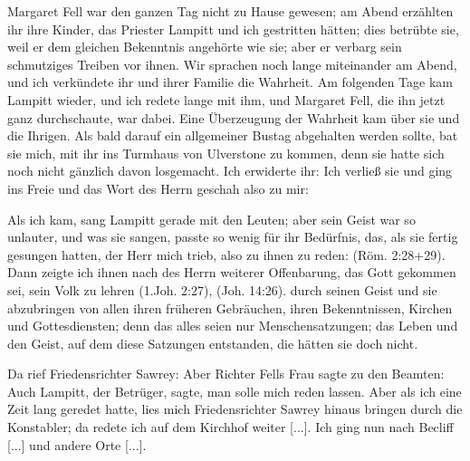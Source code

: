 Margaret 
Fell war den ganzen
Tag nicht zu Hause gewesen; am Abend erzählten ihr ihre Kinder,
das Priester Lampitt und ich gestritten hätten; dies betrübte sie,
weil er dem gleichen Bekenntnis angehörte wie sie; aber er
verbarg sein schmutziges Treiben vor ihnen.
Wir sprachen noch lange miteinander am Abend, und ich verkündete
ihr und ihrer Familie die Wahrheit. Am folgenden Tage
kam Lampitt wieder, und ich redete lange mit ihm, und Margaret
Fell, die ihn jetzt ganz durchschaute, war dabei. Eine 
Überzeugung der Wahrheit kam über sie und die Ihrigen. Als bald
darauf ein allgemeiner Bustag abgehalten 
werden sollte, bat sie
mich, mit ihr ins Turmhaus von Ulverstone 
zu kommen, denn
sie hatte sich noch nicht gänzlich davon losgemacht. Ich erwiderte
ihr:  Ich verließ sie
und ging ins Freie und das Wort des Herrn geschah also zu
mir:  


Als ich kam, sang
Lampitt gerade mit den Leuten; aber sein Geist war so unlauter,
und was sie sangen, passte so wenig 
für ihr Bedürfnis, das, als
sie fertig gesungen hatten, der Herr mich trieb, also zu ihnen zu
reden:  
(Röm. 2:28+29).
Dann zeigte ich ihnen nach des Herrn weiterer Offenbarung, das
Gott gekommen sei, sein Volk zu lehren 
(1.Joh. 2:27), 
(Joh. 14:26).
durch seinen Geist und sie abzubringen von allen ihren früheren
Gebräuchen, ihren Bekenntnissen, Kirchen und Gottesdiensten;
denn das alles seien nur Menschensatzungen; das Leben und den
Geist, auf dem diese Satzungen entstanden, die hätten sie doch
nicht. 

Da rief Friedensrichter Sawrey: 
 Aber
Richter Fells Frau sagte zu den 
Beamten:  Auch Lampitt,
der Betrüger, sagte, man solle mich reden lassen. Aber als ich eine
Zeit lang geredet hatte, lies mich Friedensrichter Sawrey hinaus
bringen durch die Konstabler; da redete ich auf dem Kirchhof
weiter [...]. Ich ging nun nach 
Becliff [...] und andere Orte [...].


